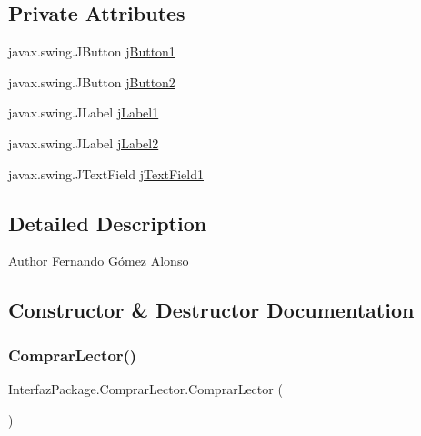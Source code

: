 \subsection*{Private Attributes}
\begin{DoxyCompactItemize}
\item 
javax.\+swing.\+J\+Button \mbox{\hyperlink{class_interfaz_package_1_1_comprar_lector_a13cefaf762557d197990543e13a3bc59}{j\+Button1}}
\item 
javax.\+swing.\+J\+Button \mbox{\hyperlink{class_interfaz_package_1_1_comprar_lector_abb0ea1df40ce44e8356e98fe9824d075}{j\+Button2}}
\item 
javax.\+swing.\+J\+Label \mbox{\hyperlink{class_interfaz_package_1_1_comprar_lector_a7e62e32a7c3e71321d44cc91402fa5d2}{j\+Label1}}
\item 
javax.\+swing.\+J\+Label \mbox{\hyperlink{class_interfaz_package_1_1_comprar_lector_aa53b79d81e5b7d3b02915635e09c9242}{j\+Label2}}
\item 
javax.\+swing.\+J\+Text\+Field \mbox{\hyperlink{class_interfaz_package_1_1_comprar_lector_abba4b0576e701088c0c1389d7e28aaa9}{j\+Text\+Field1}}
\end{DoxyCompactItemize}


\subsection{Detailed Description}
\begin{DoxyAuthor}{Author}
Fernando Gómez Alonso 
\end{DoxyAuthor}


\subsection{Constructor \& Destructor Documentation}
\mbox{\label{class_interfaz_package_1_1_comprar_lector_a8df28b89646bb4ca519fe3af6ca554c9}} 
\subsubsection{\texorpdfstring{Comprar\+Lector()}{ComprarLector()}}
{\footnotesize\ttfamily Interfaz\+Package.\+Comprar\+Lector.\+Comprar\+Lector (\begin{DoxyParamCaption}{ }\end{DoxyParamCaption})\hspace{0.3cm}{\ttfamily [inline]}}

